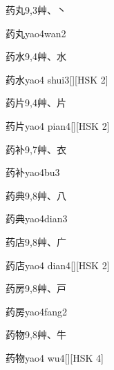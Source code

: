\begin{entry}{药丸}{9,3}{⾋、⼂}
  \begin{phonetics}{药丸}{yao4wan2}
  \end{phonetics}
\end{entry}

\begin{entry}{药水}{9,4}{⾋、⽔}
  \begin{phonetics}{药水}{yao4 shui3}[][HSK 2]
  \end{phonetics}
\end{entry}

\begin{entry}{药片}{9,4}{⾋、⽚}
  \begin{phonetics}{药片}{yao4 pian4}[][HSK 2]
  \end{phonetics}
\end{entry}

\begin{entry}{药补}{9,7}{⾋、⾐}
  \begin{phonetics}{药补}{yao4bu3}
  \end{phonetics}
\end{entry}

\begin{entry}{药典}{9,8}{⾋、⼋}
  \begin{phonetics}{药典}{yao4dian3}
  \end{phonetics}
\end{entry}

\begin{entry}{药店}{9,8}{⾋、⼴}
  \begin{phonetics}{药店}{yao4 dian4}[][HSK 2]
  \end{phonetics}
\end{entry}

\begin{entry}{药房}{9,8}{⾋、⼾}
  \begin{phonetics}{药房}{yao4fang2}
  \end{phonetics}
\end{entry}

\begin{entry}{药物}{9,8}{⾋、⽜}
  \begin{phonetics}{药物}{yao4 wu4}[][HSK 4]
  \end{phonetics}
\end{entry}

